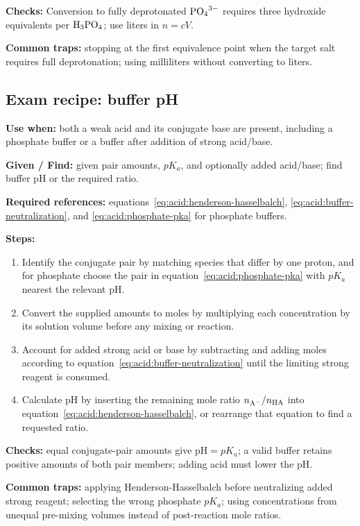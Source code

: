 \textbf{Checks:} Conversion to fully deprotonated \(\ce{PO4^3-}\) requires three hydroxide equivalents per \(\ce{H3PO4}\); use liters in \(n=cV\).

\textbf{Common traps:} stopping at the first equivalence point when the target salt requires full deprotonation; using milliliters without converting to liters.

\subsection{Exam recipe: buffer pH}
\textbf{Use when:} both a weak acid and its conjugate base are present, including a phosphate buffer or a buffer after addition of strong acid/base.

\textbf{Given / Find:} given pair amounts, \(pK_a\), and optionally added acid/base; find buffer pH or the required ratio.

\textbf{Required references:} equations~\eqref{eq:acid:henderson-hasselbalch}, \eqref{eq:acid:buffer-neutralization}, and \eqref{eq:acid:phosphate-pka} for phosphate buffers.

\textbf{Steps:}
\begin{enumerate}
    \item Identify the conjugate pair by matching species that differ by one proton, and for phosphate choose the pair in equation~\eqref{eq:acid:phosphate-pka} with \(pK_a\) nearest the relevant pH.
    \item Convert the supplied amounts to moles by multiplying each concentration by its solution volume before any mixing or reaction.
    \item Account for added strong acid or base by subtracting and adding moles according to equation~\eqref{eq:acid:buffer-neutralization} until the limiting strong reagent is consumed.
    \item Calculate pH by inserting the remaining mole ratio \(n_{\ce{A-}}/n_{\ce{HA}}\) into equation~\eqref{eq:acid:henderson-hasselbalch}, or rearrange that equation to find a requested ratio.
\end{enumerate}

\textbf{Checks:} equal conjugate-pair amounts give \(\mathrm{pH}=pK_a\); a valid buffer retains positive amounts of both pair members; adding acid must lower the pH.

\textbf{Common traps:} applying Henderson-Hasselbalch before neutralizing added strong reagent; selecting the wrong phosphate \(pK_a\); using concentrations from unequal pre-mixing volumes instead of post-reaction mole ratios.

